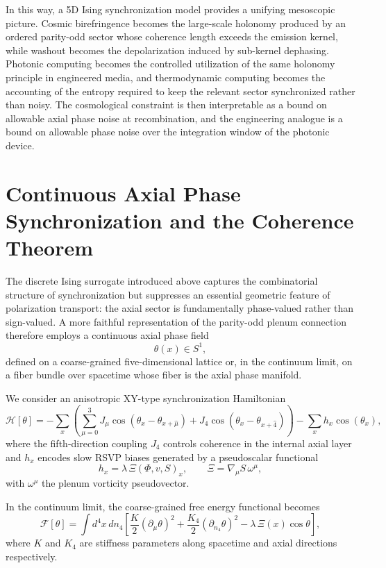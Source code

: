 \documentclass[12pt]{article}
\begin{document}
In this way, a 5D Ising synchronization model provides a unifying mesoscopic picture. Cosmic birefringence becomes the large-scale holonomy produced by an ordered parity-odd sector whose coherence length exceeds the emission kernel, while washout becomes the depolarization induced by sub-kernel dephasing. Photonic computing becomes the controlled utilization of the same holonomy principle in engineered media, and thermodynamic computing becomes the accounting of the entropy required to keep the relevant sector synchronized rather than noisy. The cosmological constraint is then interpretable as a bound on allowable axial phase noise at recombination, and the engineering analogue is a bound on allowable phase noise over the integration window of the photonic device.

\newpage
\section{Continuous Axial Phase Synchronization and the Coherence Theorem}

The discrete Ising surrogate introduced above captures the combinatorial structure of synchronization but suppresses an essential geometric feature of polarization transport: the axial sector is fundamentally phase-valued rather than sign-valued. A more faithful representation of the parity-odd plenum connection therefore employs a continuous axial phase field
\begin{equation}
\theta(x) \in S^1,
\end{equation}
defined on a coarse-grained five-dimensional lattice or, in the continuum limit, on a fiber bundle over spacetime whose fiber is the axial phase manifold.

We consider an anisotropic XY-type synchronization Hamiltonian
\begin{equation}
\mathcal{H}[\theta]
=
- \sum_{x}
\left(
\sum_{\mu=0}^{3}
J_\mu
\cos(\theta_x - \theta_{x+\hat\mu})
+
J_4
\cos(\theta_x - \theta_{x+\hat 4})
\right)
- \sum_x h_x \cos(\theta_x),
\end{equation}
where the fifth-direction coupling $J_4$ controls coherence in the internal axial layer and $h_x$ encodes slow RSVP biases generated by a pseudoscalar functional
\begin{equation}
h_x
=
\lambda \, \Xi(\Phi,v,S)_x,
\qquad
\Xi
=
\nabla_\mu S \, \omega^\mu,
\end{equation}
with $\omega^\mu$ the plenum vorticity pseudovector.

In the continuum limit, the coarse-grained free energy functional becomes
\begin{equation}
\mathcal{F}[\theta]
=
\int d^4x \, dn_4
\left[
\frac{K}{2} (\partial_\mu \theta)^2
+
\frac{K_4}{2} (\partial_{n_4} \theta)^2
-
\lambda \, \Xi(x) \cos \theta
\right],
\end{equation}
where $K$ and $K_4$ are stiffness parameters along spacetime and axial directions respectively.
\end{document}
